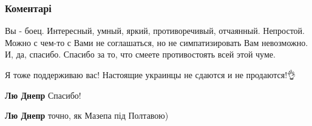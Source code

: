  
 
 
 
 
\subsubsection{Коментарі}

\begin{itemize}
 
Вы - боец. Интересный, умный, яркий, противоречивый, отчаянный. Непростой.
Можно с чем-то с Вами не соглашаться, но не симпатизировать Вам невозможно.
И, да, спасибо. Спасибо за то, что смеете противостоять всей этой чуме.

 
Я тоже поддерживаю вас! Настоящие украинцы не сдаются и не продаются!👌

\begin{itemize}
 
\textbf{Лю Днепр} Спасибо!

 
\textbf{Лю Днепр} точно, як Мазепа під Полтавою)
\end{itemize}

 

\end{itemize}

